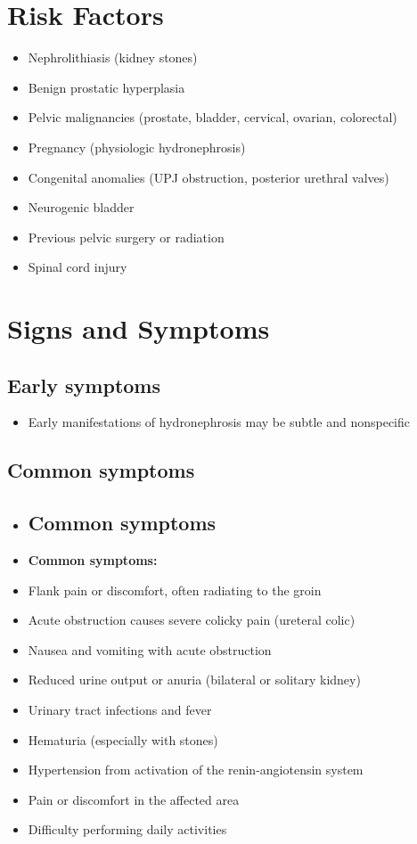 \section{Risk Factors}

\begin{itemize}[noitemsep]
  \item Nephrolithiasis (kidney stones)
  \item Benign prostatic hyperplasia
  \item Pelvic malignancies (prostate, bladder, cervical, ovarian, colorectal)
  \item Pregnancy (physiologic hydronephrosis)
  \item Congenital anomalies (UPJ obstruction, posterior urethral valves)
  \item Neurogenic bladder
  \item Previous pelvic surgery or radiation
  \item Spinal cord injury
\end{itemize}

\section{Signs and Symptoms}

\subsection{Early symptoms}
\begin{itemize}[noitemsep]
  \item Early manifestations of hydronephrosis may be subtle and nonspecific
\end{itemize}

\subsection{Common symptoms}
\begin{itemize}[noitemsep]
  \item \subsection{Common symptoms}
  \item \textbf{Common symptoms:}
  \item Flank pain or discomfort, often radiating to the groin
  \item Acute obstruction causes severe colicky pain (ureteral colic)
  \item Nausea and vomiting with acute obstruction
  \item Reduced urine output or anuria (bilateral or solitary kidney)
  \item Urinary tract infections and fever
  \item Hematuria (especially with stones)
  \item Hypertension from activation of the renin-angiotensin system
  \item Pain or discomfort in the affected area
  \item Difficulty performing daily activities
\end{itemize}

